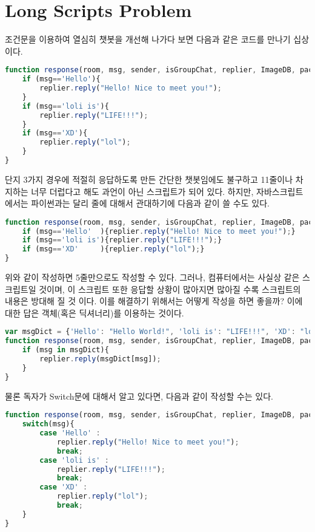 \documentclass[10pt,a4paper,final]{book}
\begin{document}
\section{Long Scripts Problem}
조건문을 이용하여 열심히 챗봇을 개선해 나가다 보면 다음과 같은 코드를 만나기 십상이다.
\begin{lstlisting}[language=JavaScript,escapeinside=~~]
function response(room, msg, sender, isGroupChat, replier, ImageDB, packageName, threadId){
    if (msg=='Hello'){
        replier.reply("Hello! Nice to meet you!");
    }
    if (msg=='loli is'){
        replier.reply("LIFE!!!");
    }
    if (msg=='XD'){
        replier.reply("lol");
    }
}
\end{lstlisting}
단지 3가지 경우에 적절히 응답하도록 만든 간단한 챗봇임에도 불구하고 11줄이나 차지하는
너무 더럽다고 해도 과언이 아닌 스크립트가 되어 있다. 하지만, 자바스크립트에서는 파이썬과는 달리
줄에 대해서 관대하기에 다음과 같이 쓸 수도 있다.
\begin{lstlisting}[language=JavaScript,escapeinside=~~]
function response(room, msg, sender, isGroupChat, replier, ImageDB, packageName, threadId){
    if (msg=='Hello'  ){replier.reply("Hello! Nice to meet you!");}
    if (msg=='loli is'){replier.reply("LIFE!!!");}
    if (msg=='XD'     ){replier.reply("lol");}
}
\end{lstlisting}
위와 같이 작성하면 5줄만으로도 작성할 수 있다. 그러나, 컴퓨터에서는 사실상 같은 스크립트일 것이며, 이 스크립트 또한
응답할 상황이 많아지면 많아질 수록 스크립트의 내용은 방대해 질 것 이다. 이를 해결하기 위해서는
어떻게 작성을 하면 좋을까? 이에 대한 답은 객체(혹은 딕셔너리)를 이용하는 것이다.
\begin{lstlisting}[language=JavaScript,escapeinside=~~]
var msgDict = {'Hello': "Hello World!", 'loli is': "LIFE!!!", 'XD': "lol"};
function response(room, msg, sender, isGroupChat, replier, ImageDB, packageName, threadId){
    if (msg in msgDict){
        replier.reply(msgDict[msg]);
    }
}
\end{lstlisting}
물론 독자가 Switch문에 대해서 알고 있다면, 다음과 같이 작성할 수는 있다.
\begin{lstlisting}[language=JavaScript,escapeinside=~~]
function response(room, msg, sender, isGroupChat, replier, ImageDB, packageName, threadId){
    switch(msg){
        case 'Hello' :
            replier.reply("Hello! Nice to meet you!");
            break;
        case 'loli is' :
            replier.reply("LIFE!!!");
            break;
        case 'XD' :
            replier.reply("lol");
            break;
    }
}
\end{lstlisting}
\end{document}
